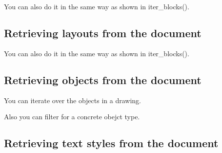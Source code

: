 \documentclass[a4paper,10pt,english]{sphinxmanual}
\begin{document}
\sphinxAtStartPar
You can also do it in the same way as shown in iter\_blocks().


\subsection{Retrieving layouts from the document}
\label{\detokenize{usage:retrieving-layouts-from-the-document}}
\begin{sphinxVerbatim}[commandchars=\\\{\}]
  
\end{sphinxVerbatim}

\sphinxAtStartPar
You can also do it in the same way as shown in iter\_blocks().


\subsection{Retrieving objects from the document}
\label{\detokenize{usage:retrieving-objects-from-the-document}}
\sphinxAtStartPar
You can iterate over the objects in a drawing.

\begin{sphinxVerbatim}[commandchars=\\\{\}]
  
\end{sphinxVerbatim}

\sphinxAtStartPar
Also you can filter for a concrete obejct type.

\begin{sphinxVerbatim}[commandchars=\\\{\}]
  
\end{sphinxVerbatim}


\subsection{Retrieving text styles from the document}
\label{\detokenize{usage:retrieving-text-styles-from-the-document}}
\begin{sphinxVerbatim}[commandchars=\\\{\}]
  
\end{sphinxVerbatim}
\end{document}
